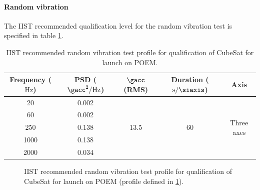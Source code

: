 \documentclass[a4paper,11pt]{article}
\begin{document}
\paragraph{Random vibration}

The IIST recommended qualification level for the random vibration test is specified in table \ref{tabl:random-vibration-profile-iist}.

\begin{table}[t]
  \centering
  \begin{tabular}{|c | c | c | c | c|}
    \hline
    \textbf{Frequency ($\si{\hertz}$)} & \textbf{PSD ($\si{\square\gacc\per\hertz}$)} & \textbf{$\si{\gacc}$ (RMS)} & \textbf{Duration ($\si{\second\per\siaxis}$)} & \textbf{Axis}               \\ \hline
    20                                 & 0.002                                        & \multirow{5}{*}{13.5}       & \multirow{5}{*}{60}                           & \multirow{5}{*}{Three axes} \\ \cline{1-2}
    60                                 & 0.002                                        &                             &                                               &                             \\ \cline{1-2}
    250                                & 0.138                                        &                             &                                               &                             \\ \cline{1-2}
    1000                               & 0.138                                        &                             &                                               &                             \\ \cline{1-2}
    2000                               & 0.034                                        &                             &                                               &                             \\ \hline
  \end{tabular}
  \caption{IIST recommended random vibration test profile for qualification of CubeSat for launch on POEM.}
  \label{tabl:random-vibration-profile-iist}
\end{table}


\begin{figure}[b]
  \centering
  
  \label{fig:random-vibration-qualification-level}
  \caption{IIST recommended random vibration test profile for qualification of CubeSat for launch on POEM (profile defined in \ref{tabl:random-vibration-profile-iist}).}
\end{figure}
\end{document}
